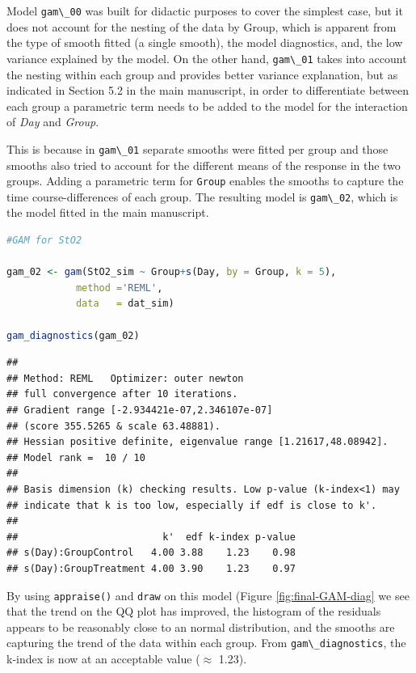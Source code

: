 \documentclass[
]{article}
\newcommand{\passthrough}[1]{#1}
\begin{document}
Model \passthrough{\lstinline!gam\_00!} was built for didactic purposes to cover the simplest case, but it does not account for the nesting of the data by Group, which is apparent from the type of smooth fitted (a single smooth), the model diagnostics, and, the low variance explained by the model. On the other hand, \passthrough{\lstinline!gam\_01!} takes into account the nesting within each group and provides better variance explanation, but as indicated in Section 5.2 in the main manuscript, in order to differentiate between each group a parametric term needs to be added to the model for the interaction of \emph{Day} and \emph{Group}.

This is because in \passthrough{\lstinline!gam\_01!} separate smooths were fitted per group and those smooths also tried to account for the different means of the response in the two groups. Adding a parametric term for \passthrough{\lstinline!Group!} enables the smooths to capture the time course-differences of each group. The resulting model is \passthrough{\lstinline!gam\_02!}, which is the model fitted in the main manuscript.

\begin{lstlisting}[language=R]
#GAM for StO2

gam_02 <- gam(StO2_sim ~ Group+s(Day, by = Group, k = 5),
            method ='REML',
            data   = dat_sim)

gam_diagnostics(gam_02)
\end{lstlisting}

\begin{lstlisting}
## 
## Method: REML   Optimizer: outer newton
## full convergence after 10 iterations.
## Gradient range [-2.934421e-07,2.346107e-07]
## (score 355.5265 & scale 63.48881).
## Hessian positive definite, eigenvalue range [1.21617,48.08942].
## Model rank =  10 / 10 
## 
## Basis dimension (k) checking results. Low p-value (k-index<1) may
## indicate that k is too low, especially if edf is close to k'.
## 
##                         k'  edf k-index p-value
## s(Day):GroupControl   4.00 3.88    1.23    0.98
## s(Day):GroupTreatment 4.00 3.90    1.23    0.97
\end{lstlisting}

By using \passthrough{\lstinline!appraise()!} and \passthrough{\lstinline!draw!} on this model (Figure \ref{fig:final-GAM-diag} we see that the trend on the QQ plot has improved, the histogram of the residuals appears to be reasonably close to an normal distribution, and the smooths are capturing the trend of the data within each group. From \passthrough{\lstinline!gam\_diagnostics!}, the k-index is now at an acceptable value (\(\approx\) 1.23).
\end{document}
